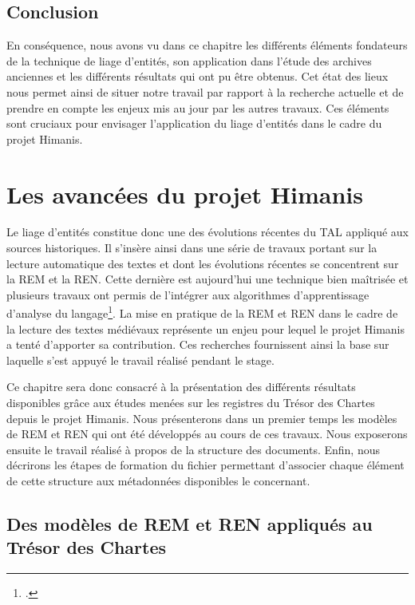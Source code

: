 \documentclass[a4paper,12pt,twoside]{book}
\begin{document}
	\section*{Conclusion}
	
	En conséquence, nous avons vu dans ce chapitre les différents éléments fondateurs de la technique de liage d'entités, son application dans l'étude des archives anciennes et les différents résultats qui ont pu être obtenus. Cet état des lieux nous permet ainsi de situer notre travail par rapport à la recherche actuelle et de prendre en compte les enjeux mis au jour par les autres travaux. Ces éléments sont cruciaux pour envisager l'application du liage d'entités dans le cadre du projet Himanis.
	
	\chapter{Les avancées du projet Himanis}
	
	Le liage d'entités constitue donc une des évolutions récentes du TAL appliqué aux sources historiques. Il s'insère ainsi dans une série de travaux portant sur la lecture automatique des textes et dont les évolutions récentes se concentrent sur la REM et la REN. Cette dernière est aujourd'hui une technique bien maîtrisée et plusieurs travaux ont permis de l'intégrer aux algorithmes d'apprentissage d'analyse du langage\footcite{suarez_establishing_2020}. La mise en pratique de la REM et REN dans le cadre de la lecture des textes médiévaux représente un enjeu pour lequel le projet Himanis a tenté d'apporter sa contribution. Ces recherches fournissent ainsi la base sur laquelle s'est appuyé le travail réalisé pendant le stage.
	
	Ce chapitre sera donc consacré à la présentation des différents résultats disponibles grâce aux études menées sur les registres du Trésor des Chartes depuis le projet Himanis. Nous présenterons dans un premier temps les modèles de REM et REN qui ont été développés au cours de ces travaux. Nous exposerons ensuite le travail réalisé à propos de la structure des documents. Enfin, nous décrirons les étapes de formation du fichier permettant d'associer chaque élément de cette structure aux métadonnées disponibles le concernant.
		
	\section{Des modèles de REM et REN appliqués au Trésor des Chartes}
	
\end{document}
